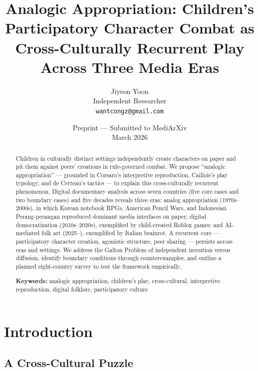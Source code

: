 \documentclass[12pt]{article}
\title{Analogic Appropriation: Children's Participatory Character Combat as Cross-Culturally Recurrent Play Across Three Media Eras}
\author{Jiyeon Yoon\\
Independent Researcher\\
\texttt{wantcongz@gmail.com}}
\date{Preprint --- Submitted to MediArXiv\\March 2026}
\begin{document}
\maketitle

\begin{abstract}
Children in culturally distinct settings independently create characters on paper and pit them against peers' creations in rule-governed combat. We propose ``analogic appropriation'' --- grounded in Corsaro's interpretive reproduction, Caillois's play typology, and de Certeau's tactics --- to explain this cross-culturally recurrent phenomenon. Digital documentary analysis across seven countries (five core cases and two boundary cases) and five decades reveals three eras: analog appropriation (1970s--2000s), in which Korean notebook RPGs, American Pencil Wars, and Indonesian Perang-perangan reproduced dominant media interfaces on paper; digital democratization (2010s--2020s), exemplified by child-created Roblox games; and AI-mediated folk art (2025--), exemplified by Italian brainrot. A recurrent core --- participatory character creation, agonistic structure, peer sharing --- persists across eras and settings. We address the Galton Problem of independent invention versus diffusion, identify boundary conditions through counterexamples, and outline a planned eight-country survey to test the framework empirically.

\medskip
\noindent\textbf{Keywords:} analogic appropriation, children's play, cross-cultural, interpretive reproduction, digital folklore, participatory culture
\end{abstract}

\section{Introduction}

\subsection{A Cross-Cultural Puzzle}
\end{document}
